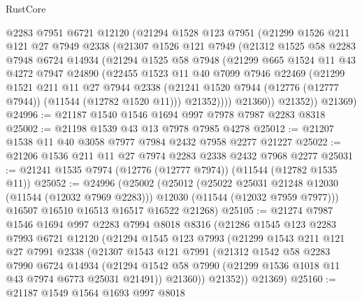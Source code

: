 \begin{lexlean}{RustCore}
\begin{coremodule}
      @2283
      @7951
      @6721
      @12120
      (@21294
        @1528
        @123
        @7951
        (@21299
          @1526
          @211
          @121
          @27
          @7949
          @2338
          (@21307
            @1526
            @121
            @7949
            (@21312
              @1525
              @58
              @2283
              @7948
              @6724
              @14934
              (@21294
                @1525
                @58
                @7948
                (@21299
                  @665
                  @1524
                  @11
                  @43
                  @4272
                  @7947
                  @24890
                  (@22455
                    @1523
                    @11
                    @40
                    @7099
                    @7946
                    @22469
                    (@21299
                      @1521
                      @211
                      @11
                      @27
                      @7944
                      @2338
                      (@21241 @1520 @7944 (@12776 (@12777 @7944)) (@11544 (@12782 @1520 @11)))
                      @21352))))
              @21360))
          @21352))
      @21369)
@24996 := @21187 @1540 @1546 @1694 @997 @7978 @7987 @2283 @8318
@25002 := @21198 @1539 @43 @13 @7978 @7985 @4278
@25012 := @21207 @1538 @11 @40 @3058 @7977 @7984 @2432 @7958 @2277 @21227
@25022 := @21206 @1536 @211 @11 @27 @7974 @2283 @2338 @2432 @7968 @2277
@25031 := @21241 @1535 @7974 (@12776 (@12777 @7974)) (@11544 (@12782 @1535 @11))
@25052 := @24996
    (@25002
      (@25012
        (@25022 @25031 @21248 @12030 (@11544 (@12032 @7969 @2283)))
        @12030
        (@11544 (@12032 @7959 @7977)))
      @16507
      @16510
      @16513
      @16517
      @16522
      @21268)
@25105 := @21274
    @7987
    @1546
    @1694
    @997
    @2283
    @7994
    @8018
    @8316
    (@21286
      @1545
      @123
      @2283
      @7993
      @6721
      @12120
      (@21294
        @1545
        @123
        @7993
        (@21299
          @1543
          @211
          @121
          @27
          @7991
          @2338
          (@21307
            @1543
            @121
            @7991
            (@21312
              @1542
              @58
              @2283
              @7990
              @6724
              @14934
              (@21294 @1542 @58 @7990 (@21299 @1536 @1018 @11 @43 @7974 @6773 @25031 @21491))
              @21360))
          @21352))
      @21369)
@25160 := @21187
    @1549
    @1564
    @1693
    @997
    @8018

\end{coremodule}
\end{lexlean}
